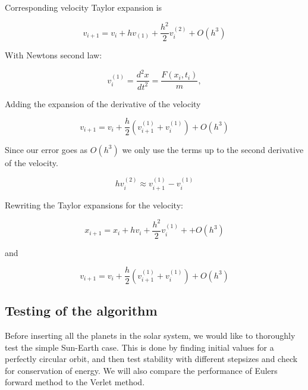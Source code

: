 \documentclass[../main.tex]{subfiles}
\begin{document}
Corresponding velocity Taylor expansion is

\begin{equation}
  v_{i+1} = v_i + hv_{(1)} + \frac{h^2}{2} v_i^{(2)} + O(h^3)
\end{equation}

With Newtons second law:

\begin{equation}
  v_i^{(1)} = \frac{d^2x}{dt^2} = \frac{F(x_i, t_i)}{m},
\end{equation}

Adding the expansion of the derivative of the velocity

\begin{equation}
  v_{i+1} = v_i + \frac{h}{2}\left(v_{i+1}^{(1)} + v_i^{(1)}\right) + O(h^3)
\end{equation}

Since our error goes as $O(h^3)$ we only use the terms up to the second derivative of the velocity.

\begin{equation}
  hv_i^{(2)}\approx v_{i+1}^{(1)} - v_i^{(1)}
\end{equation}

Rewriting the Taylor expansions for the velocity:

\begin{equation}
  x_{i+1} = x_i + hv_i + \frac{h^2}{2} v_i^{(1)} + + O(h^3)
\end{equation}

and

\begin{equation}
  v_{i+1} = v_i + \frac{h}{2} \left(v_{i+1}^{(1)} + v_i^{(1)}\right) + O(h^3)
\end{equation}

\subsection{Testing of the algorithm}
Before inserting all the planets in the solar system, we would like to thoroughly test the simple Sun-Earth case. This is done by finding initial values for a perfectly circular orbit, and then test stability with different stepsizes and check for conservation of energy. We will also compare the performance of Eulers forward method to the Verlet method.

\end{document}
